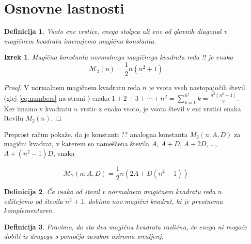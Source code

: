 \documentclass[a4paper,12pt]{article}
\newtheorem{definicija}{Definicija}
\newcommand{\m}{\mathcal{M}_2}
\newtheorem{izrek}{Izrek}
\begin{document}

\section{Osnovne lastnosti}

\begin{definicija}
      Vsoto ene vrstice, enega stolpca ali ene od glavnih diagonal
      v magičnem kvadratu imenujemo \emph{magična konstanta}.
\end{definicija}

\begin{izrek}
   Magična konstanta normalnega magičnega kvadrata reda !!
   je enaka
   \begin{equation}
      \m(n) = \frac{1}{2}n(n^2 + 1)
   \end{equation}
\end{izrek}


   
   \begin{proof}
      V normalnem magičnem kvadratu reda \(n\) je vsota vseh nastopajočih
      števil (glej \ref{eq:numbers} na strani \pageref{eq:numbers} ) enaka
      \( 1 + 2 + 3 + \cdots + n^2
= \sum_{k=1}^{n^2} k
= \frac{n^2(n^2+1)}{2} \). Ker imamo
      v kvadratu \(n\) vrstic z enako vsoto, je vsota števil v eni vrstici
      enaka številu \(M_2(n)\). %
   \end{proof}


Preprost račun pokaže, da je konstanti ?? analogna konstanta
\(M_2(n;A,D)\) za magični kvadrat, v katerem so nameščena števila
\(A\), \(A+D\), \(A+2D\), \ldots, \(A+(n^2-1)D\), enaka %

\[ \m(n;A,D)= \frac{1}{2}n(2A+D(n^2-1))\]

\begin{definicija}
      Če vsako od števil v normalnem magičnem kvadratu reda \(n\) odštejemo
      od števila \(n^2+1\), dobimo nov magični kvadrat, ki je prvotnemu
      \emph{komplementaren}.
\end{definicija}

\begin{definicija}
      Pravimo, da sta dva magična kvadrata \emph{različna}, če enega ni mogoče dobiti
      iz drugega s pomočjo zasukov oziroma zrcaljenj.
\end{definicija}
\end{document}
